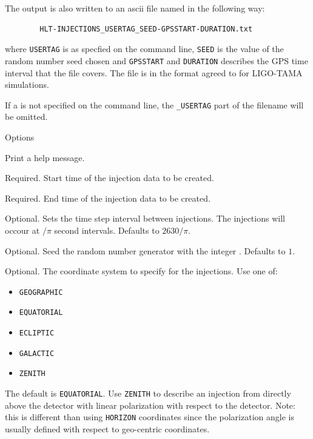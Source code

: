 \begin{entry}
The output is also written to an ascii file named in the following way:
\begin{center}
\begin{verbatim}
        HLT-INJECTIONS_USERTAG_SEED-GPSSTART-DURATION.txt
\end{verbatim}
\end{center}
where \verb$USERTAG$ is  as specfied on the command line,
\verb$SEED$ is the  value  of  the random number seed chosen and
\verb$GPSSTART$ and \verb$DURATION$ describes the GPS time interval that
the file covers. The file is in the format agreed to for LIGO-TAMA
simulations.  

If a  is not specified on the command line, the
\texttt{\_USERTAG} part of the filename will be omitted.

\item[Options]\leavevmode
\begin{entry}
\item[\option{--help}] Print a help message.

\item[\option{--gps-start-time} \parm{tstart}]
Required.  Start time of the injection data to be created.

\item[\option{--gps-end-time} \parm{tend}]
Required.  End time of the injection data to be created.

\item[\option{--time-step} \parm{tstep}]
Optional. Sets the time step interval between injections. The injections
will occour at $/\pi$ second intervals. Defaults to $2630/\pi$.

\item[\option{--seed} \parm{seed}]
Optional. Seed the random number generator with the integer .
Defaults to $1$.

\item[\option{--coordinates} \parm{coordinates}] 
Optional.  The coordinate system to specify for the injections.  Use one
of:
\begin{itemize}
\item \texttt{GEOGRAPHIC}
\item \texttt{EQUATORIAL}
\item \texttt{ECLIPTIC}
\item \texttt{GALACTIC}
\item \texttt{ZENITH}
\end{itemize}
The default is \texttt{EQUATORIAL}.   Use \texttt{ZENITH} to describe an
injection from directly above the detector with linear polarization with
respect to the detector.  Note:  this is different than using
\texttt{HORIZON} coordinates since the polarization angle is usually
defined with respect to geo-centric coordinates.


\end{entry}
\end{entry}

